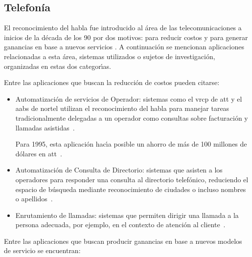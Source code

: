 \subsection{Telefon\'ia}
\label{sec:telefonia}

El reconocimiento del habla fue introducido al \'area de las telecomunicaciones a inicios de la d\'ecada
de los 90 por dos motivos: para reducir costos y para generar ganancias en base a nuevos servicios \cite{RabinerApplications1997}.
A continuaci\'on se mencionan aplicaciones relacionadas a esta \'area, sistemas utilizados o sujetos de investigaci\'on, 
organizadas en estas dos categor{\'\i}as. 

Entre las aplicaciones que buscan la reducci\'on de costos pueden citarse:

\begin{itemize}
	\item  Automatizaci\'on de servicios de Operador: sistemas como el \gls{vrcp} de \gls{att} 
	y el \gls{aabs} de \gls{nortel} utilizan el reconocimiento del habla para manejar tareas tradicionalmente delegadas
	a un operador como consultas sobre facturaci\'on y llamadas \mbox{asistidas \cite{RabinerApplications1997}}.

	Para 1995, esta aplicaci\'on hac{\'\i}a posible un ahorro de m\'as de 100 millones de d\'olares 
	en \mbox{\gls{att} \cite{WilponApplications1994}}.

	\item Automatizaci\'on de Consulta de Directorio: sistemas que asisten a los operadores
	para responder una consulta al directorio telef\'onico, reduciendo el espacio de b\'usqueda mediante
	reconocimiento de ciudades o incluso nombres o \mbox{apellidos \cite{RabinerApplications1997}}.

	\item Enrutamiento de llamadas: sistemas que permiten dirigir una llamada a la persona adecuada,
	por ejemplo, en el contexto de atenci\'on al \mbox{cliente \cite{Sachs97howmay}}.
\end{itemize}

Entre las aplicaciones que buscan producir ganancias en base a nuevos modelos de servicio se encuentran:

